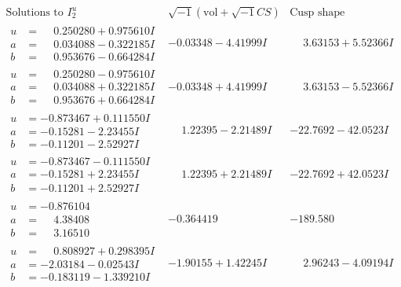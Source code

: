 \documentclass[1p]{elsarticle_modified}
\theoremstyle{definition}
\newcommand{\I}{\sqrt{-1}}
\begin{document}
$$\begin{array}{c|c|c}  
\text{Solutions to }I^u_{2}& \I (\text{vol} + \sqrt{-1}CS) & \text{Cusp shape}\\
 \hline 
\begin{aligned}
u &= \phantom{-}0.250280 + 0.975610 I \\
a &= \phantom{-}0.034088 - 0.322185 I \\
b &= \phantom{-}0.953676 - 0.664284 I\end{aligned}
 & -0.03348 - 4.41999 I & \phantom{-}3.63153 + 5.52366 I \\ \hline\begin{aligned}
u &= \phantom{-}0.250280 - 0.975610 I \\
a &= \phantom{-}0.034088 + 0.322185 I \\
b &= \phantom{-}0.953676 + 0.664284 I\end{aligned}
 & -0.03348 + 4.41999 I & \phantom{-}3.63153 - 5.52366 I \\ \hline\begin{aligned}
u &= -0.873467 + 0.111550 I \\
a &= -0.15281 - 2.23455 I \\
b &= -0.11201 - 2.52927 I\end{aligned}
 & \phantom{-}1.22395 - 2.21489 I & -22.7692 - 42.0523 I \\ \hline\begin{aligned}
u &= -0.873467 - 0.111550 I \\
a &= -0.15281 + 2.23455 I \\
b &= -0.11201 + 2.52927 I\end{aligned}
 & \phantom{-}1.22395 + 2.21489 I & -22.7692 + 42.0523 I \\ \hline\begin{aligned}
u &= -0.876104\phantom{ +0.000000I} \\
a &= \phantom{-}4.38408\phantom{ +0.000000I} \\
b &= \phantom{-}3.16510\phantom{ +0.000000I}\end{aligned}
 & -0.364419\phantom{ +0.000000I} & -189.580\phantom{ +0.000000I} \\ \hline\begin{aligned}
u &= \phantom{-}0.808927 + 0.298395 I \\
a &= -2.03184 - 0.02543 I \\
b &= -0.183119 - 1.339210 I\end{aligned}
 & -1.90155 + 1.42245 I & \phantom{-}2.96243 - 4.09194 I \\ \hline\begin{aligned}

\end{aligned}
\end{array}$$
\end{document}
